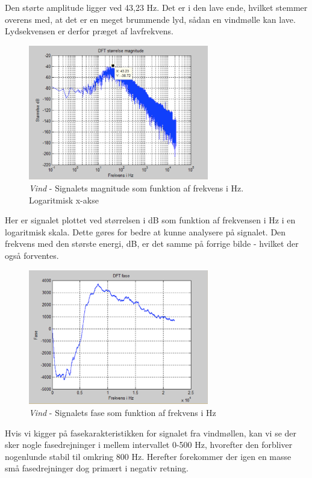 Den størte amplitude ligger ved 43,23 Hz. Det er i den lave ende, hvilket stemmer overens med, at det er en meget brummende lyd, sådan en vindmølle kan lave. Lydsekvensen er derfor præget af lavfrekvens. 

\begin{figure}[H]
	\centering
	\includegraphics[width=0.7\textwidth]{Figurer/Vind3}
	\caption{\textit{Vind} - Signalets magnitude som funktion af frekvens i Hz. Logaritmisk x-akse}
\end{figure}

Her er signalet plottet ved størrelsen i dB som funktion af frekvensen i Hz i en logaritmisk skala. Dette gøres for bedre at kunne analysere på signalet. Den frekvens med den største energi, dB, er det samme på forrige bilde - hvilket der også forventes. 

\begin{figure}[H]
	\centering
	\includegraphics[width=0.7\textwidth]{Figurer/Vind4}
	\caption{\textit{Vind} - Signalets fase som funktion af frekvens i Hz}
\end{figure}

Hvis vi kigger på fasekarakteristikken for signalet fra vindmøllen, kan vi se der sker nogle fasedrejninger i mellem intervallet 0-500 Hz, hvorefter den forbliver nogenlunde stabil til omkring 800 Hz. Herefter forekommer der igen en masse små fasedrejninger dog primært i negativ retning.  


